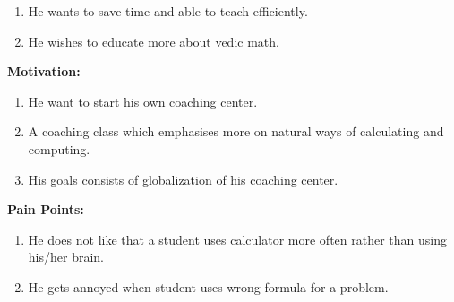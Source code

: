 \documentclass{article}
\begin{document}
\begin{multicols}{2}[]
\begin{enumerate}
    \item He wants to save time and able to teach efficiently.
    \item He wishes to educate more about vedic math.
\end{enumerate}
\textbf{Motivation:}
\begin{enumerate}
    \item He want to start his own coaching center.
    \item A coaching class which emphasises more on natural ways of calculating and computing.
    \item His goals consists of globalization of his coaching center.
\end{enumerate}
\textbf{Pain Points:}
\begin{enumerate}
    \item He does not like that a student uses calculator more often rather than using his/her brain.
    \item He gets annoyed when student uses wrong formula for a problem.
\end{enumerate}
\end{multicols}
\newpage
\end{document}
